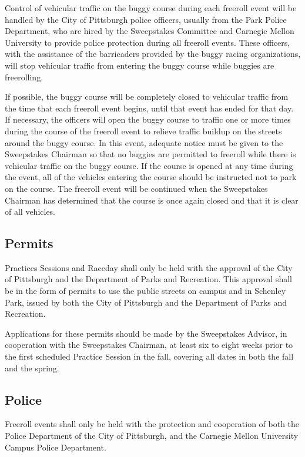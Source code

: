 	Control of vehicular traffic on the buggy course during each freeroll event will be handled by the City of Pittsburgh police officers, usually from the Park Police Department, who are hired by the Sweepstakes Committee and Carnegie Mellon University to provide police protection during all freeroll events. These officers, with the assistance of the barricaders provided by the buggy racing organizations, will stop vehicular traffic from entering the buggy course while buggies are freerolling.

	If possible, the buggy course will be completely closed to vehicular traffic from the time that each freeroll event begins, until that event has ended for that day. If necessary, the officers will open the buggy course to traffic one or more times during the course of the freeroll event to relieve traffic buildup on the streets around the buggy course. In this event, adequate notice must be given to the Sweepstakes Chairman so that no buggies are permitted to freeroll while there is vehicular traffic on the buggy course. If the course is opened at any time during the event, all of the vehicles entering the course should be instructed not to park on the course. The freeroll event will be continued when the Sweepstakes Chairman has determined that the course is once again closed and that it is clear of all vehicles.
	
\subsection{Permits}

	Practices Sessions and Raceday shall only be held with the approval of the City of Pittsburgh and the Department of Parks and Recreation. This approval shall be in the form of permits to use the public streets on campus and in Schenley Park, issued by both the City of Pittsburgh and the Department of Parks and Recreation.

	Applications for these permits should be made by the Sweepstakes Advisor, in cooperation with the Sweepstakes Chairman, at least six to eight weeks prior to the first scheduled Practice Session in the fall, covering all dates in both the fall and the spring.
	
\subsection{Police}

	Freeroll events shall only be held with the protection and cooperation of both the Police Department of the City of Pittsburgh, and the Carnegie Mellon University Campus Police Department.

